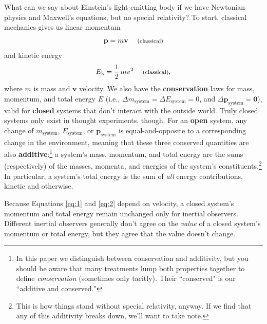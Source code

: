\documentclass[12pt]{article}
\renewcommand{\vv}[1]{\mathbf{#1}}
\begin{document}
What can we say about Einstein's light-emitting body if we have Newtonian physics and Maxwell's equations, but no special relativity? To start, classical mechanics gives us linear momentum
\begin{equation}\label{eq:1}
\vv p=m\vv v \quad \text{\footnotesize{ (classical)}}
\end{equation}
and kinetic energy
\begin{equation}\label{eq:2}
E_{\mkern.5mu \textrm{k}}= \frac{1}{2} \, m v ^2 \quad \text{\footnotesize{ (classical)}},
\end{equation}
where $m$ is mass and $\vv{v}$ velocity. We also have the \textbf{conservation} laws for mass, momentum, and total energy $E$ (i.e., $\Delta m_{\mathrm{system}} = \Delta E_{\mathrm{system}} = 0$, and $\Delta \vv p_{\mathrm{system}} = \vv 0$), valid for \textbf{closed} systems that don't interact with the outside world. Truly closed systems only exist in thought experiments, though. For an \textbf{open} system, any change of $m_{\mathrm{system}}$, $E_{\mathrm{system}}$, or $\vv p_{\mathrm{system}}$ is equal-and-opposite to a corresponding change in the environment, meaning that these three conserved quantities are also \textbf{additive}:\footnote{In this paper we distinguish between conservation and additivity, but you should be aware that many treatments lump both properties together to define \emph{conservation} (sometimes only tacitly). Their ``conserved" is our ``additive and conserved."} a system's mass, momentum, and total energy are the sums (respectively) of the masses, momenta, and energies of the system's constituents.\footnote{\label{fn:ad}This is how things stand without special relativity, anyway. If we find that any of this additivity breaks down, we'll want to take note.} In particular, a system's total energy is the sum of \emph{all} energy contributions, kinetic and otherwise.

Because Equations \ref{eq:1} and \ref{eq:2} depend on velocity, a closed system's momentum and total energy remain unchanged only for inertial observers. Different inertial observers generally don't agree on the \emph{value} of a closed system's momentum or total energy, but they agree that the value doesn't change.
\end{document}
